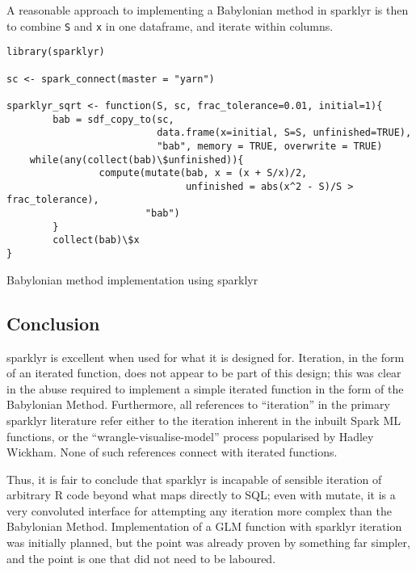 \documentclass[a4paper,10pt]{article}
\begin{document}
A reasonable approach to implementing a Babylonian method in sparklyr is then
to combine \texttt{S} and \texttt{x} in one dataframe, and iterate within
columns.

\begin{listing}
\begin{verbatim}
library(sparklyr)

sc <- spark_connect(master = "yarn")

sparklyr_sqrt <- function(S, sc, frac_tolerance=0.01, initial=1){
        bab = sdf_copy_to(sc,
                          data.frame(x=initial, S=S, unfinished=TRUE),
                          "bab", memory = TRUE, overwrite = TRUE)
	while(any(collect(bab)\$unfinished)){
                compute(mutate(bab, x = (x + S/x)/2,
                               unfinished = abs(x^2 - S)/S > frac_tolerance),
                        "bab")
        }
        collect(bab)\$x
}
\end{verbatim}
\caption{Babylonian method implementation using sparklyr}\label{src:sparklyr-bab}
\end{listing}


\subsection{Conclusion}\label{sec:conclusion}

sparklyr is excellent when used for what it is designed for.
Iteration, in the form of an iterated function, does not appear to be part of
this design;
this was clear in the abuse required to implement a simple iterated function in
the form of the Babylonian Method.
Furthermore, all references to ``iteration'' in the primary sparklyr literature
refer either to the iteration inherent in the inbuilt Spark ML functions, or
the ``wrangle-visualise-model'' process popularised by Hadley
Wickham\cite{luraschi2019mastering}\cite{wickham2016r}.
None of such references connect with iterated functions.

Thus, it is fair to conclude that sparklyr is incapable of sensible iteration
of arbitrary R code beyond what maps directly to SQL; 
even with mutate, it is a very convoluted interface for attempting any
iteration more complex than the Babylonian Method.
Implementation of a GLM function with sparklyr iteration was initially planned,
but the point was already proven by something far simpler, and the point is one
that did not need to be laboured.
\end{document}
